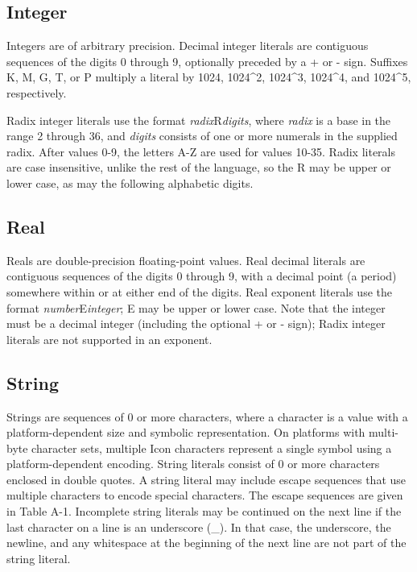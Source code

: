 \subsection*{Integer}

Integers are of arbitrary precision. Decimal integer
literals are contiguous sequences of the digits 0 through 9, optionally
preceded by a + or - sign.  Suffixes K, M, G, T, or P multiply
a literal by 1024, 1024\^{}2, 1024\^{}3, 1024\^{}4, and
1024\^{}5, respectively.

Radix integer literals use the format
\textit{radix}R\textit{digits}, where \textit{radix} is a base in the
range 2 through 36, and \textit{digits} consists of one or more
numerals in the supplied radix. After values 0-9, the letters A-Z are
used for values 10-35. Radix literals are case insensitive, unlike the
rest of the language, so the R may be upper or lower case, as may the
following alphabetic digits.

\subsection*{Real}

Reals are double-precision floating-point values.
Real decimal literals are contiguous sequences of the digits 0 through
9, with a decimal point (a period) somewhere within or at either end of
the digits. Real exponent literals use the format
\textit{number}E\textit{integer}; E may be upper or lower case.
Note that the integer must be a decimal integer (including the optional
+ or - sign); Radix integer literals are not supported in an exponent.

\subsection*{String}

Strings are sequences of 0 or more characters, where a
character is a value with a platform-dependent size and symbolic
representation. On platforms with multi-byte character sets, multiple
Icon characters represent a single symbol using a platform-dependent
encoding.
String literals consist of 0 or more characters enclosed in double
quotes. A string literal may include escape sequences that use multiple
characters to encode special characters. The escape sequences are given
in Table A-1. Incomplete string literals may
be continued on the next line if the last character on a line is an
underscore (\_). In that case, the underscore, the newline, and any
whitespace at the beginning of the next line are not part of the string
literal.

